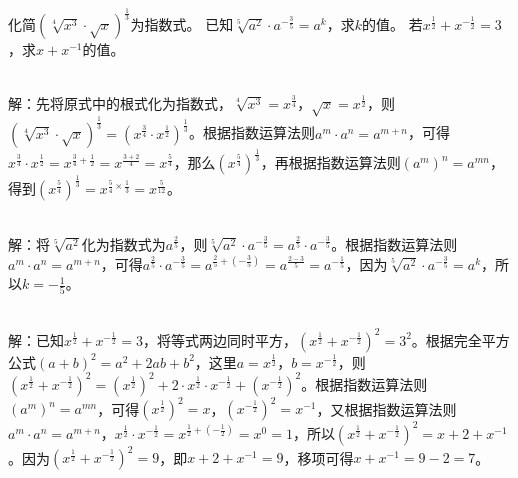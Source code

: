 \documentclass{ctexart}
\newenvironment{MyAnswer}[1][] %
{
    \begin{tcolorbox}[breakable, colframe=blue]
    \begin{Answer}[#1] \color{blue} \kaishu
        }  %
    {\end{Answer}
\end{tcolorbox}
}
\begin{document}
\begin{Exercise}[title={根式与指数式互换进阶练习}, label={ex:radical - exponential - advanced}]
    \Question 化简\((\sqrt[4]{x^3}\cdot\sqrt{x})^{\frac{1}{3}}\)为指数式。
    \Question 已知\(\sqrt[5]{a^2}\cdot a^{-\frac{3}{5}} = a^k\)，求\(k\)的值。
    \Question 若\(x^{\frac{1}{2}}+x^{-\frac{1}{2}} = 3\)，求\(x + x^{-1}\)的值。
\end{Exercise}
\begin{MyAnswer}[ref={ex:radical - exponential - advanced}]
        \Question {}\\ 解：先将原式中的根式化为指数式，\(\sqrt[4]{x^3}=x^{\frac{3}{4}}\)，\(\sqrt{x}=x^{\frac{1}{2}}\)，则\((\sqrt[4]{x^3}\cdot\sqrt{x})^{\frac{1}{3}}=(x^{\frac{3}{4}}\cdot x^{\frac{1}{2}})^{\frac{1}{3}}\)。根据指数运算法则\(a^m\cdot a^n=a^{m + n}\)，可得\(x^{\frac{3}{4}}\cdot x^{\frac{1}{2}}=x^{\frac{3}{4}+\frac{1}{2}}=x^{\frac{3 + 2}{4}}=x^{\frac{5}{4}}\)，那么\((x^{\frac{5}{4}})^{\frac{1}{3}}\)，再根据指数运算法则\((a^m)^n=a^{mn}\)，得到\((x^{\frac{5}{4}})^{\frac{1}{3}}=x^{\frac{5}{4}\times\frac{1}{3}}=x^{\frac{5}{12}}\)。

        \Question {}\\ 解：将\(\sqrt[5]{a^2}\)化为指数式为\(a^{\frac{2}{5}}\)，则\(\sqrt[5]{a^2}\cdot a^{-\frac{3}{5}}=a^{\frac{2}{5}}\cdot a^{-\frac{3}{5}}\)。根据指数运算法则\(a^m\cdot a^n=a^{m + n}\)，可得\(a^{\frac{2}{5}}\cdot a^{-\frac{3}{5}}=a^{\frac{2}{5}+(-\frac{3}{5})}=a^{\frac{2 - 3}{5}}=a^{-\frac{1}{5}}\)，因为\(\sqrt[5]{a^2}\cdot a^{-\frac{3}{5}} = a^k\)，所以\(k = -\frac{1}{5}\)。

        \Question  {}\\  解：已知\(x^{\frac{1}{2}}+x^{-\frac{1}{2}} = 3\)，将等式两边同时平方，\((x^{\frac{1}{2}}+x^{-\frac{1}{2}})^2 = 3^2\)。根据完全平方公式\((a + b)^2=a^2 + 2ab + b^2\)，这里\(a = x^{\frac{1}{2}}\)，\(b = x^{-\frac{1}{2}}\)，则\((x^{\frac{1}{2}}+x^{-\frac{1}{2}})^2=(x^{\frac{1}{2}})^2+2\cdot x^{\frac{1}{2}}\cdot x^{-\frac{1}{2}}+(x^{-\frac{1}{2}})^2\)。根据指数运算法则\((a^m)^n=a^{mn}\)，可得\((x^{\frac{1}{2}})^2=x\)，\((x^{-\frac{1}{2}})^2=x^{-1}\)，又根据指数运算法则\(a^m\cdot a^n=a^{m + n}\)，\(x^{\frac{1}{2}}\cdot x^{-\frac{1}{2}}=x^{\frac{1}{2}+(-\frac{1}{2})}=x^0 = 1\)，所以\((x^{\frac{1}{2}}+x^{-\frac{1}{2}})^2=x + 2 + x^{-1}\)。因为\((x^{\frac{1}{2}}+x^{-\frac{1}{2}})^2 = 9\)，即\(x + 2 + x^{-1}=9\)，移项可得\(x + x^{-1}=9 - 2 = 7\)。
\end{MyAnswer}
\end{document}
